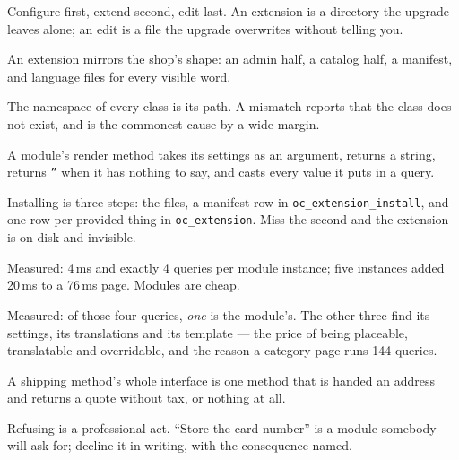 \begin{chaptersummary}
\begin{tight}
  \item Configure first, extend second, edit last. An extension is a directory
        the upgrade leaves alone; an edit is a file the upgrade overwrites
        without telling you.
  \item An extension mirrors the shop's shape: an admin half, a catalog half, a
        manifest, and language files for every visible word.
  \item The namespace of every class is its path. A mismatch reports that the
        class does not exist, and is the commonest cause by a wide margin.
  \item A module's render method takes its settings as an argument, returns a
        string, returns \texttt{''} when it has nothing to say, and casts every
        value it puts in a query.
  \item Installing is three steps: the files, a manifest row in
        \texttt{oc\_extension\_install}, and one row per provided thing in
        \texttt{oc\_extension}. Miss the second and the extension is on disk
        and invisible.
  \item Measured: 4\,ms and exactly 4 queries per module instance; five
        instances added 20\,ms to a 76\,ms page. Modules are cheap.
  \item Measured: of those four queries, \emph{one} is the module's. The other
        three find its settings, its translations and its template --- the
        price of being placeable, translatable and overridable, and the reason
        a category page runs 144 queries.
  \item A shipping method's whole interface is one method that is handed an
        address and returns a quote without tax, or nothing at all.
  \item Refusing is a professional act. ``Store the card number'' is a module
        somebody will ask for; decline it in writing, with the consequence
        named.
\end{tight}
\end{chaptersummary}

